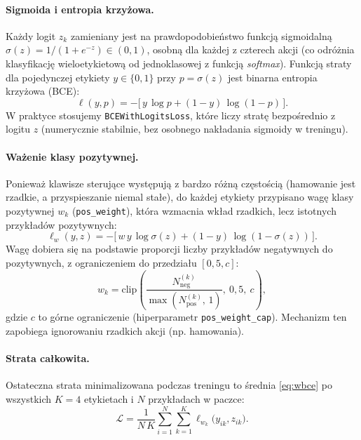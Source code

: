 \documentclass[11pt,a4paper]{article}
\begin{document}
\paragraph{Sigmoida i entropia krzyżowa.}
Każdy logit $z_k$ zamieniany jest na prawdopodobieństwo funkcją sigmoidalną
$\sigma(z) = 1/(1 + e^{-z}) \in (0,1)$, osobną dla każdej z czterech akcji (co
odróżnia klasyfikację wieloetykietową od jednoklasowej z funkcją \emph{softmax}).
Funkcją straty dla pojedynczej etykiety $y\in\{0,1\}$ przy $p=\sigma(z)$ jest
binarna entropia krzyżowa (BCE):
\begin{equation}
\ell(y, p) = -\big[\,y\,\log p + (1-y)\,\log(1-p)\,\big].
\label{eq:bce}
\end{equation}
W praktyce stosujemy \texttt{BCEWithLogitsLoss}, które liczy stratę bezpośrednio
z logitu $z$ (numerycznie stabilnie, bez osobnego nakładania sigmoidy w treningu).

\paragraph{Ważenie klasy pozytywnej.}
Ponieważ klawisze sterujące występują z bardzo różną częstością (hamowanie jest
rzadkie, a przyspieszanie niemal stałe), do każdej etykiety przypisano wagę klasy
pozytywnej $w_k$ (\texttt{pos\_weight}), która wzmacnia wkład rzadkich, lecz
istotnych przykładów pozytywnych:
\begin{equation}
\ell_{w}(y, z) = -\big[\,w\,y\,\log\sigma(z) + (1-y)\,\log(1-\sigma(z))\,\big].
\label{eq:wbce}
\end{equation}
Wagę dobiera się na podstawie proporcji liczby przykładów negatywnych do
pozytywnych, z ograniczeniem do przedziału $[0{,}5, c]$:
\begin{equation}
w_k = \mathrm{clip}\!\left(\frac{N_\text{neg}^{(k)}}{\max(N_\text{pos}^{(k)},\,1)},\ 0{,}5,\ c\right),
\label{eq:posweight}
\end{equation}
gdzie $c$ to górne ograniczenie (hiperparametr \texttt{pos\_weight\_cap}).
Mechanizm ten zapobiega ignorowaniu rzadkich akcji (np. hamowania).

\paragraph{Strata całkowita.}
Ostateczna strata minimalizowana podczas treningu to średnia
\eqref{eq:wbce} po wszystkich $K=4$ etykietach i $N$ przykładach w paczce:
\begin{equation}
\mathcal{L} = \frac{1}{N\,K}\sum_{i=1}^{N}\sum_{k=1}^{K}
\ell_{w_k}\!\big(y_{ik}, z_{ik}\big).
\label{eq:total-loss}
\end{equation}
\end{document}
